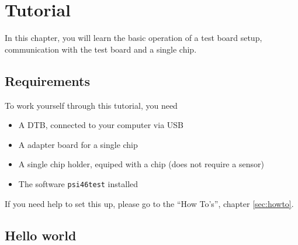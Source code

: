 \chapter{Tutorial}
In this chapter, you will learn the basic operation of a test board setup, communication with the test board and a single chip.

\section{Requirements}
To work yourself through this tutorial, you need
\begin{itemize}
    \item A DTB, connected to your computer via USB
    \item A adapter board for a single chip
    \item A single chip holder, equiped with a chip (does not require a sensor)
    \item The software \texttt{psi46test} installed
\end{itemize}
If you need help to set this up, please go to the \enquote{How To's}, chapter \ref{sec:howto}.

\section{Hello world}



